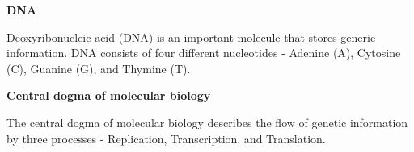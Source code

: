 \documentclass[12pt, answers]{exam}
\begin{document}
\begin{questions}
 
\question \textbf{DNA}
  
Deoxyribonucleic acid (DNA) is an important molecule that stores generic information. DNA consists of four different nucleotides - Adenine (A), Cytosine (C), Guanine (G), and Thymine (T).

\vspace{0.1 in}


\question \textbf{Central dogma of molecular biology}
  
The central dogma of molecular biology describes the flow of genetic information by three processes - Replication, Transcription, and Translation.

\vspace{0.1 in}

\end{questions}
\end{document}
